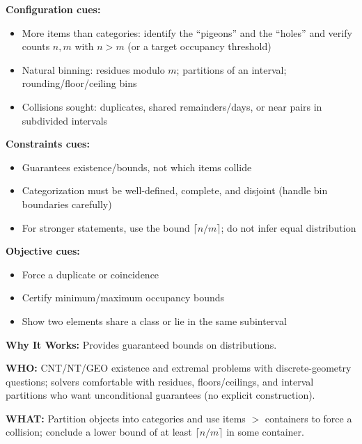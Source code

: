 \documentclass[12pt]{article}
\begin{document}
\textbf{Configuration cues:}
\begin{itemize}
    \item More items than categories: identify the ``pigeons'' and the ``holes'' and verify counts $n,m$ with $n>m$ (or a target occupancy threshold)
    \item Natural binning: residues modulo $m$; partitions of an interval; rounding/floor/ceiling bins
    \item Collisions sought: duplicates, shared remainders/days, or near pairs in subdivided intervals
\end{itemize}

\textbf{Constraints cues:}
\begin{itemize}
    \item Guarantees existence/bounds, not which items collide
    \item Categorization must be well-defined, complete, and disjoint (handle bin boundaries carefully)
    \item For stronger statements, use the bound $\lceil n/m \rceil$; do not infer equal distribution
\end{itemize}

\textbf{Objective cues:}
\begin{itemize}
    \item Force a duplicate or coincidence
    \item Certify minimum/maximum occupancy bounds
    \item Show two elements share a class or lie in the same subinterval
\end{itemize}

\textbf{Why It Works:} Provides guaranteed bounds on distributions.

\textbf{WHO:} CNT/NT/GEO existence and extremal problems with discrete-geometry questions; solvers comfortable with residues, floors/ceilings, and interval partitions who want unconditional guarantees (no explicit construction).

\textbf{WHAT:} Partition objects into categories and use items $>$ containers to force a collision; conclude a lower bound of at least $\lceil n/m \rceil$ in some container.
\end{document}
